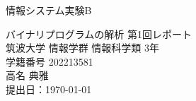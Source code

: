 \begin{titlepage}

\begin{flushright}
{\large
情報システム実験B
}
\end{flushright}
\begin{center}
\vspace*{200truept}
{\Huge バイナリプログラムの解析 第1回レポート}\\
\vspace{300truept}
{\LARGE 筑波大学 情報学群 情報科学類 3年}\\
\vspace{10truept}
{\LARGE 学籍番号 202213581}\\
\vspace{40truept}
{\huge 高名 典雅}\\
\vspace{40truept}
{\huge 提出日：\today}\\
\end{center}

\end{titlepage}

